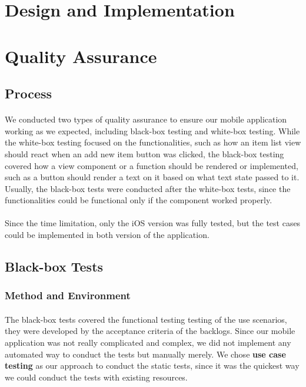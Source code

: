 \documentclass[12pt,a4paper]{article}
\begin{document}
    \section{Design and Implementation}
    \section{Quality Assurance} %
      \label{chapter:Quality Assurance}
      
      \subsection{Process} %
        \paragraph{} We conducted two types of quality assurance to ensure our mobile application working as we expected, including black-box testing and white-box testing. While the white-box testing focused on the functionalities, such as how an item list view should react when an add new item button was clicked, the black-box testing covered how a view component or a function should be rendered or implemented, such as a button should render a text on it based on what text state passed to it. Usually, the black-box tests were conducted after the white-box tests, since the functionalities could be functional only if the component worked properly. 

        \paragraph{} Since the time limitation, only the iOS version was fully tested, but the test cases could be implemented in both version of the application.

      \subsection{Black-box Tests}
        \subsubsection{Method and Environment} %
          \paragraph{} The black-box tests covered the functional testing testing of the use scenarios, they were developed by the acceptance criteria of the backlogs. Since our mobile application was not really complicated and complex, we did not implement any automated way to conduct the tests but manually merely. We chose {\bf use case testing} as our approach to conduct the static tests, since it was the quickest way we could conduct the tests with existing resources.
          
\end{document}
